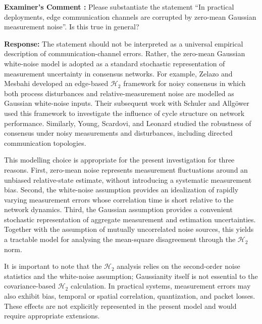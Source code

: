 \documentclass[11pt,a4paper]{article}
\newcounter{examcomment}
\renewcommand{\theexamcomment}{\arabic{examcomment}}
\newcommand{\comment}[1]{%
\refstepcounter{examcomment}%
\par\vspace{5pt}\noindent
\colorbox{gray!13}{%
	\parbox{\dimexpr\linewidth-2\fboxsep}{%
		\textbf{Examiner's Comment \theexamcomment:} #1%
	}%
}%
\par
}
\newcommand{\response}{\par\textbf{Response:} }
\newcommand{\revision}{\par\textbf{Proposed thesis revision:} }
\begin{document}

\comment{Please substantiate the statement ``In practical deployments, edge communication channels are corrupted by zero-mean Gaussian measurement noise''. Is this true in general?}
\response
The statement should not be interpreted as a universal empirical description of communication-channel errors. Rather, the zero-mean Gaussian white-noise model is adopted as a standard stochastic representation of measurement uncertainty in consensus networks. For example, Zelazo and Mesbahi developed an edge-based $\mathcal{H}_2$ framework for noisy consensus in which both process disturbances and relative-measurement noise are modelled as Gaussian white-noise inputs. Their subsequent work with Schuler and Allgöwer used this framework to investigate the influence of cycle structure on network performance. Similarly, Young, Scardovi, and Leonard studied the robustness of consensus under noisy measurements and disturbances, including directed communication topologies.

This modelling choice is appropriate for the present investigation for three reasons. First, zero-mean noise represents measurement fluctuations around an unbiased relative-state estimate, without introducing a systematic measurement bias. Second, the white-noise assumption provides an idealization of rapidly varying measurement errors whose correlation time is short relative to the network dynamics. Third, the Gaussian assumption provides a convenient stochastic representation of aggregate measurement and estimation uncertainties. Together with the assumption of mutually uncorrelated noise sources, this yields a tractable model for analysing the mean-square disagreement through the $\mathcal{H}_2$ norm.

It is important to note that the $\mathcal{H}_2$ analysis relies on the second-order noise statistics and the white-noise assumption; Gaussianity itself is not essential to the covariance-based $\mathcal{H}_2$ calculation. In practical systems, measurement errors may also exhibit bias, temporal or spatial correlation, quantization, and packet losses. These effects are not explicitly represented in the present model and would require appropriate extensions.

\end{document}
